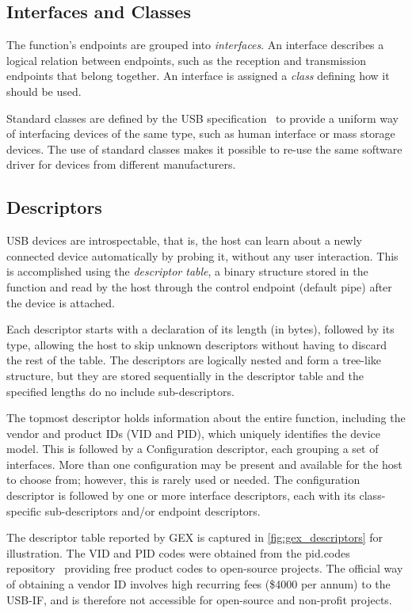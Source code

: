\subsection{Interfaces and Classes}

The function's endpoints are grouped into \textit{interfaces}. An interface describes a logical relation between endpoints, such as the reception and transmission endpoints that belong together. An interface is assigned a \textit{class} defining how it should be used.

Standard classes are defined by the \gls{USB} specification~\cite{usb-class-list} to provide a uniform way of interfacing devices of the same type, such as human interface or mass storage devices. The use of standard classes makes it possible to re-use the same software driver for devices from different manufacturers.

\subsection{Descriptors}

USB devices are introspectable, that is, the host can learn about a newly connected device automatically by probing it, without any user interaction. This is accomplished using the \textit{descriptor table}, a binary structure stored in the function and read by the host through the control endpoint (default pipe) after the device is attached.

Each descriptor starts with a declaration of its length (in bytes), followed by its type,  allowing the host to skip unknown descriptors without having to discard the rest of the table. The descriptors are logically nested and form a tree-like structure, but they are stored sequentially in the descriptor table and the specified lengths do no include sub-descriptors.

The topmost descriptor holds information about the entire function, including the vendor and product IDs (VID and PID), which uniquely identifies the device model. This is followed by a Configuration descriptor, each grouping a set of interfaces. More than one configuration may be present and available for the host to choose from; however, this is rarely used or needed. The configuration descriptor is followed by one or more interface descriptors, each with its class-specific sub-descriptors and/or endpoint descriptors.

The descriptor table reported by GEX is captured in \cref{fig:gex_descriptors} for illustration. The VID and PID codes were obtained from the pid.codes repository~\cite{pidcodes} providing free product codes to open-source projects. The official way of obtaining a vendor ID involves high recurring fees (\$4000 per annum) to the USB-IF, and is therefore not accessible for open-source and non-profit projects.

